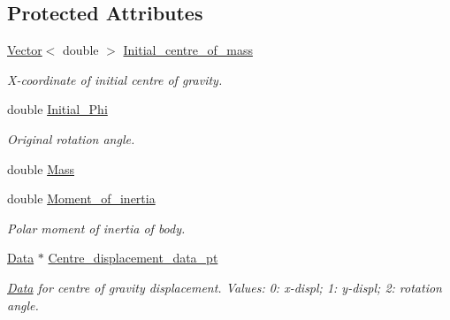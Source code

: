 \subsection*{Protected Attributes}
\begin{DoxyCompactItemize}
\item 
\hyperlink{classoomph_1_1Vector}{Vector}$<$ double $>$ \hyperlink{classoomph_1_1ImmersedRigidBodyElement_af848df31315115071bdde1eded9aa6d1}{Initial\+\_\+centre\+\_\+of\+\_\+mass}
\begin{DoxyCompactList}\small\item\em X-\/coordinate of initial centre of gravity. \end{DoxyCompactList}\item 
double \hyperlink{classoomph_1_1ImmersedRigidBodyElement_a689973058034ff2b8476202ed2fb0f96}{Initial\+\_\+\+Phi}
\begin{DoxyCompactList}\small\item\em Original rotation angle. \end{DoxyCompactList}\item 
double \hyperlink{classoomph_1_1ImmersedRigidBodyElement_ac2dcda38cf2bd20d0a6bb830a6fde91f}{Mass}
\item 
double \hyperlink{classoomph_1_1ImmersedRigidBodyElement_ab410ae35b8e4c034ed721731c8a165a6}{Moment\+\_\+of\+\_\+inertia}
\begin{DoxyCompactList}\small\item\em Polar moment of inertia of body. \end{DoxyCompactList}\item 
\hyperlink{classoomph_1_1Data}{Data} $\ast$ \hyperlink{classoomph_1_1ImmersedRigidBodyElement_a87594c1ac3388016571800ef590e0873}{Centre\+\_\+displacement\+\_\+data\+\_\+pt}
\begin{DoxyCompactList}\small\item\em \hyperlink{classoomph_1_1Data}{Data} for centre of gravity displacement. Values\+: 0\+: x-\/displ; 1\+: y-\/displ; 2\+: rotation angle. \end{DoxyCompactList}\end{DoxyCompactItemize}
